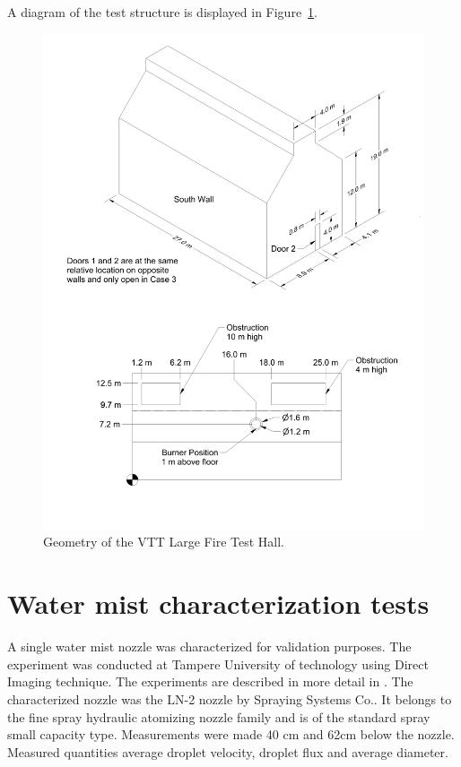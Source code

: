 A diagram of the test structure is displayed in Figure~\ref{VTT_Drawing}.
\begin{figure}
\begin{center}
\includegraphics[height=6.in]{FIGURES/VTT/VTT_Drawing}
\end{center}
\caption[Geometry of the VTT Large Fire Test Hall]{Geometry of the VTT Large Fire Test Hall.}
\label{VTT_Drawing}
\end{figure}


\section{Water mist characterization tests}

 A single water mist nozzle was characterized for validation purposes. The experiment was conducted at Tampere University of technology using Direct Imaging technique. The experiments are described in more detail in \cite{vaari:2012}. The characterized  nozzle  was the LN-2 nozzle by Spraying Systems Co.. It belongs to the fine spray hydraulic atomizing nozzle family and is of the standard spray small capacity type. Measurements were made 40  cm and 62cm below the nozzle. Measured quantities average droplet velocity, droplet flux and average diameter.  

